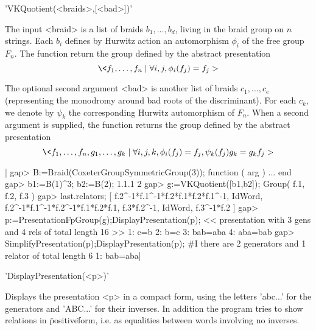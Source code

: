 
'VKQuotient(<braids>,[<bad>])'

The input  <braid> is a  list of  braids $b_1,\dots,b_d$, living  in the
braid group  on $n$ strings.  Each $b_i$  defines by Hurwitz  action an
automorphism $\phi_i$ of  the free group $F_n$. The  function return the
group  defined by  the abstract  presentation\: $$\<  f_1,\dots,f_n \mid
\forall i,j, \phi_i(f_j)=f_j > $$

The  optional   second  argument  <bad>   is  another  list   of  braids
$c_1,\dots,c_e$  (representing the  monodromy  around bad  roots of  the
discriminant). For each  $c_k$, we denote by  $\psi_k$ the corresponding
Hurwitz automorphism of  $F_n$. When a second argument  is supplied, the
function  returns  the  group  defined by  the  abstract  presentation\:
$$\<  f_1,\dots,f_n,g_1,\dots,g_k \mid  \forall i,j,k,  \phi_i(f_j)=f_j,
\psi_k(f_j) g_k=g_k f_j > $$


|    gap> B:=Braid(CoxeterGroupSymmetricGroup(3));
    function ( arg ) ... end
    gap> b1:=B(1)^3; b2:=B(2);                   
    1.1.1
    2
    gap> g:=VKQuotient([b1,b2]);                 
    Group( f.1, f.2, f.3 )
    gap>  last.relators;  
    [ f.2^-1*f.1^-1*f.2*f.1*f.2*f.1^-1, IdWord,
      f.2^-1*f.1^-1*f.2^-1*f.1*f.2*f.1, f.3*f.2^-1, IdWord, f.3^-1*f.2 ]
    gap> p:=PresentationFpGroup(g);DisplayPresentation(p);
    << presentation with 3 gens and 4 rels of total length 16 >>
    1: c=b
    2: b=c
    3: bab=aba
    4: aba=bab
    gap> SimplifyPresentation(p);DisplayPresentation(p);
    #I  there are 2 generators and 1 relator of total length 6
    1: bab=aba|


'DisplayPresentation(<p>)'

Displays  the presentation  <p> in  a  compact form,  using the  letters
'abc...' for the generators and 'ABC...' for their inverses. In addition
the  program tries  to  show  relations in  \"positive\"  form, i.e.  as
equalities between words involving no inverses.


